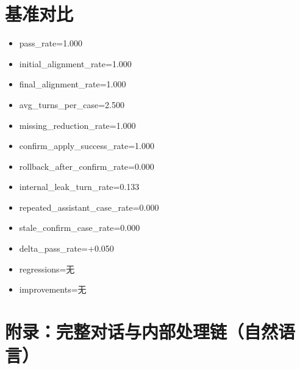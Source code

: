 \documentclass[11pt]{ctexart}
\begin{document}
\section{基准对比}
\begin{itemize}
\item pass\_rate=1.000
\item initial\_alignment\_rate=1.000
\item final\_alignment\_rate=1.000
\item avg\_turns\_per\_case=2.500
\item missing\_reduction\_rate=1.000
\item confirm\_apply\_success\_rate=1.000
\item rollback\_after\_confirm\_rate=0.000
\item internal\_leak\_turn\_rate=0.133
\item repeated\_assistant\_case\_rate=0.000
\item stale\_confirm\_case\_rate=0.000
\item delta\_pass\_rate=+0.050
\item regressions=无
\item improvements=无
\end{itemize}
\appendix
\section{附录：完整对话与内部处理链（自然语言）}
\end{document}
